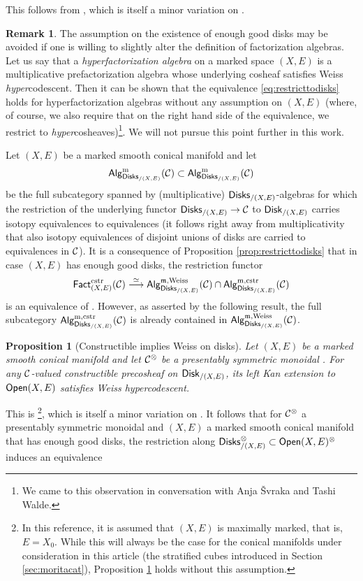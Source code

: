 \documentclass[10pt, reqno, twoside
, final
]{amsart}
\numberwithin{equation}{subsection}%
\theoremstyle{definition}
\theoremstyle{definition}
\theoremstyle{definition}
\theoremstyle{definition}
\theoremstyle{definition}
\theoremstyle{definition}
\theoremstyle{definition}
\theoremstyle{definition}
\theoremstyle{definition}
\theoremstyle{plain}
\theoremstyle{definition}
\theoremstyle{plain}
\theoremstyle{definition}
\theoremstyle{plain}
\theoremstyle{definition}
\newtheorem{rmk}[defn]{Remark}
\theoremstyle{definition}
\theoremstyle{plain}
\theoremstyle{plain}
\theoremstyle{definition}
\theoremstyle{plain}
\theoremstyle{plain}
\newtheorem{prop}[defn]{Proposition}
\theoremstyle{plain}
\begin{document}
This follows from \cite[Proposition 7.10]{KS}, which is itself a minor variation on \cite[Proposition 4.3.2]{KSW}.
\begin{rmk}
The assumption on the existence of enough good disks may be avoided if one is willing to slightly alter the definition of factorization algebras. Let us say that a \emph{hyperfactorization algebra} on a marked space $(X,E)$ is a multiplicative prefactorization algebra whose underlying cosheaf satisfies Weiss \emph{hyper}codescent. Then it can be shown that the equivalence \eqref{eq:restricttodisks} holds for hyperfactorization algebras without any assumption on $(X,E)$ (where, of course, we also require that on the right hand side of the equivalence, we restrict to \emph{hyper}cosheaves)\footnote{We came to this observation in conversation with Anja \v{S}vraka and Tashi Walde.}. We will not pursue this point further in this work.  
\end{rmk}
Let $(X,E)$ be a marked smooth conical manifold and let
\[  \mathsf{Alg}^{\mathrm{m}}_{\mathsf{Disks}_{/(X,E)}}(\mathcal{C})\subset \mathsf{Alg}^{\mathrm{m}}_{\mathsf{Disks}_{/(X,E)}}(\mathcal{C}) \]
be the full subcategory spanned by (multiplicative) $\mathsf{Disks}_{/(X,E)}$-algebras for which the restriction of the underlying functor $\mathsf{Disks}_{/(X,E)}\rightarrow \mathcal{C}$ to $\mathsf{Disk}_{/(X,E)}$ carries isotopy equivalences to equivalences (it follows right away from multiplicativity that also isotopy equivalences of disjoint unions of disks are carried to equivalences in $\mathcal{C}$). It is a consequence of Proposition \ref{prop:restricttodisks} that in case $(X,E)$ has enough good disks, the restriction functor 
\[ \mathsf{Fact}_{(X,E)}^{\mathrm{cstr}}(\mathcal{C}) \overset{\simeq}{\longrightarrow} \mathsf{Alg}^{\mathfrak{m},\mathrm{Weiss}}_{\mathsf{Disks}_{/(X,E)}}(\mathcal{C}) \cap \mathsf{Alg}^{\mathrm{m},\mathrm{cstr}}_{\mathsf{Disks}_{/(X,E)}}(\mathcal{C}) \]
is an equivalence of \infcatst. However, as asserted by the following result, the full subcategory $\mathsf{Alg}^{\mathrm{m},\mathrm{cstr}}_{\mathsf{Disks}_{/(X,E)}}(\mathcal{C})$ is already contained in $\mathsf{Alg}^{\mathfrak{m},\mathrm{Weiss}}_{\mathsf{Disks}_{/(X,E)}}(\mathcal{C})$.
\begin{prop}[Constructible implies Weiss on disks]\label{prop:constructibleweissondisks}
Let $(X,E)$ be a marked smooth conical manifold and let $\mathcal{C}^{\otimes}$ be a presentably symmetric monoidal \infcatt. For any $\mathcal{C}$-valued constructible precosheaf on $\mathsf{Disk}_{/(X,E)}$, its left Kan extension to $\mathsf{Open}(X,E)$ satisfies Weiss hypercodescent. 
\end{prop}
This is \cite[Theorem 7.33]{KS}\footnote{In this reference, it is assumed that $(X,E)$ is maximally marked, that is, $E=X_0$. While this will always be the case for the conical manifolds under consideration in this article (the stratified cubes introduced in Section \ref{sec:moritacat}), Proposition \ref{prop:constructibleweissondisks} holds without this assumption.}, which is itself a minor variation on \cite[Theorem 5.3.1]{KSW}. It follows that for $\mathcal{C}^{\otimes}$ a presentably symmetric monoidal \infcat and $(X,E)$ a marked smooth conical manifold that has enough good disks, the restriction along $\mathsf{Disks}_{/(X,E)}^{\otimes}\subset\mathsf{Open}(X,E)^{\otimes}$ induces an equivalence 
\end{document}
